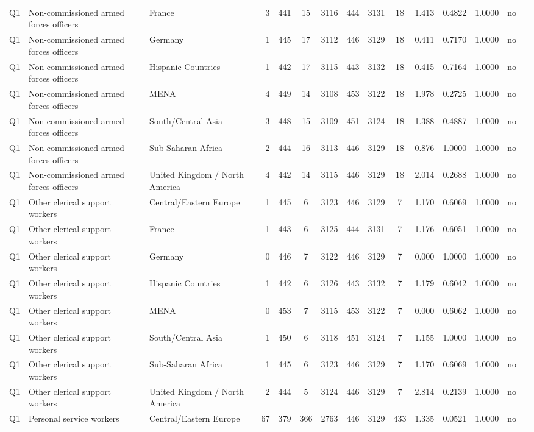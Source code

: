 \begin{longtable}{lllrcccccccccll}
Q1 & Non-commissioned armed forces officers & France & 3 & 441 & 15 & 3116 & 444 & 3131 & 18 & 1.413 & 0.4822 & 1.0000 & no \\
Q1 & Non-commissioned armed forces officers & Germany & 1 & 445 & 17 & 3112 & 446 & 3129 & 18 & 0.411 & 0.7170 & 1.0000 & no \\
Q1 & Non-commissioned armed forces officers & Hispanic Countries & 1 & 442 & 17 & 3115 & 443 & 3132 & 18 & 0.415 & 0.7164 & 1.0000 & no \\
Q1 & Non-commissioned armed forces officers & MENA & 4 & 449 & 14 & 3108 & 453 & 3122 & 18 & 1.978 & 0.2725 & 1.0000 & no \\
Q1 & Non-commissioned armed forces officers & South/Central Asia & 3 & 448 & 15 & 3109 & 451 & 3124 & 18 & 1.388 & 0.4887 & 1.0000 & no \\
Q1 & Non-commissioned armed forces officers & Sub-Saharan Africa & 2 & 444 & 16 & 3113 & 446 & 3129 & 18 & 0.876 & 1.0000 & 1.0000 & no \\
Q1 & Non-commissioned armed forces officers & United Kingdom / North America & 4 & 442 & 14 & 3115 & 446 & 3129 & 18 & 2.014 & 0.2688 & 1.0000 & no \\
Q1 & Other clerical support workers & Central/Eastern Europe & 1 & 445 & 6 & 3123 & 446 & 3129 & 7 & 1.170 & 0.6069 & 1.0000 & no \\
Q1 & Other clerical support workers & France & 1 & 443 & 6 & 3125 & 444 & 3131 & 7 & 1.176 & 0.6051 & 1.0000 & no \\
Q1 & Other clerical support workers & Germany & 0 & 446 & 7 & 3122 & 446 & 3129 & 7 & 0.000 & 1.0000 & 1.0000 & no \\
Q1 & Other clerical support workers & Hispanic Countries & 1 & 442 & 6 & 3126 & 443 & 3132 & 7 & 1.179 & 0.6042 & 1.0000 & no \\
Q1 & Other clerical support workers & MENA & 0 & 453 & 7 & 3115 & 453 & 3122 & 7 & 0.000 & 0.6062 & 1.0000 & no \\
Q1 & Other clerical support workers & South/Central Asia & 1 & 450 & 6 & 3118 & 451 & 3124 & 7 & 1.155 & 1.0000 & 1.0000 & no \\
Q1 & Other clerical support workers & Sub-Saharan Africa & 1 & 445 & 6 & 3123 & 446 & 3129 & 7 & 1.170 & 0.6069 & 1.0000 & no \\
Q1 & Other clerical support workers & United Kingdom / North America & 2 & 444 & 5 & 3124 & 446 & 3129 & 7 & 2.814 & 0.2139 & 1.0000 & no \\
Q1 & Personal service workers & Central/Eastern Europe & 67 & 379 & 366 & 2763 & 446 & 3129 & 433 & 1.335 & 0.0521 & 1.0000 & no \\

\end{longtable}
